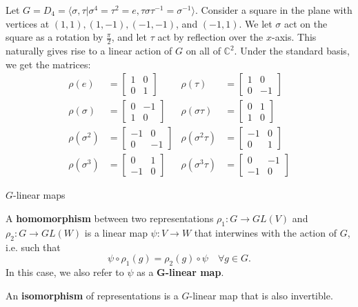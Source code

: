 \begin{frame}[plain]
\begin{example}
Let $G = D_4 = \langle \sigma, \tau |  \sigma^4 = \tau^2 = e, \tau \sigma \tau^{-1} = \sigma^{-1} \rangle$.  Consider a square in the plane with vertices at $(1,1), (1,-1), (-1, -1)$, and $(-1, 1)$.  We let $\sigma$ act on the square as a rotation by $\frac{\pi}{2}$, and let $\tau$ act by reflection over the $x$-axis.  This naturally gives rise to a linear action of $G$ on all of $\mathbb{C}^2$.  \pause  Under the standard basis, we get the matrices:
\begin{align*}
\rho( e) &= \begin{bmatrix} 1 & 0 \\ 0 & 1\end{bmatrix}  &\rho (\tau) &= \begin{bmatrix} 1 & 0 \\ 0 & -1\end{bmatrix} \\
\rho (\sigma) &= \begin{bmatrix} 0 & -1 \\ 1 & 0  \end{bmatrix} & \rho (\sigma \tau ) &= \begin{bmatrix} 0 & 1 \\ 1 & 0\end{bmatrix} \\
\rho (\sigma^2) &= \begin{bmatrix} -1 & 0 \\ 0 & -1  \end{bmatrix} & \rho (\sigma^2 \tau) &= \begin{bmatrix} -1 & 0 \\ 0 & 1\end{bmatrix} \\
\rho (\sigma^3) &= \begin{bmatrix} 0 & 1 \\ -1 & 0  \end{bmatrix} & \rho (\sigma^3 \tau) &= \begin{bmatrix} 0 & -1 \\ -1 & 0\end{bmatrix}
\end{align*}
\end{example}
\end{frame}

\begin{frame}{$G$-linear maps}
\begin{definition}
A \textbf{homomorphism} between two representations $\rho_1 \colon G \to GL(V)$ and $\rho_2 \colon G \to GL(W)$ is a linear map $\psi \colon V \to W$ that interwines with the action of $G$, i.e. such that
\[ \psi \circ \rho_1 (g)= \rho_2(g) \circ \psi \quad \forall  g \in G. \]  
In this case, we also refer to $\psi$ as a $\mathbf{G}$\textbf{-linear map}.
\end{definition}
\begin{definition}
An \textbf{isomorphism} of representations is a $G$-linear map that is also invertible.
\end{definition}
\end{frame}

